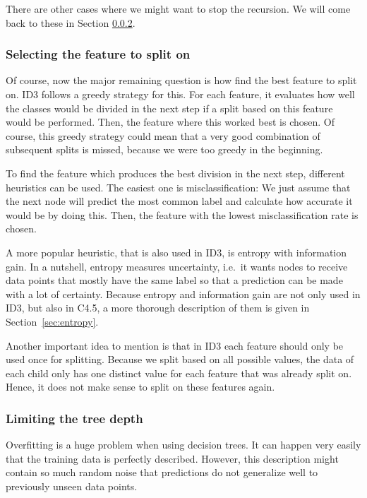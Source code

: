 \documentclass[a4paper]{article}
\begin{document}
There are other cases where we might want to stop the recursion. We will come back to these in Section \ref{subsec:id3-depth}.

\subsubsection{Selecting the feature to split on}

Of course, now the major remaining question is how find the best feature to split on. ID3 follows a greedy strategy for this. For each feature, it evaluates how well the classes would be divided in the next step if a split based on this feature would be performed. Then, the feature where this worked best is chosen. Of course, this greedy strategy could mean that a very good combination of subsequent splits is missed, because we were too greedy in the beginning.

To find the feature which produces the best division in the next step, different heuristics can be used. The easiest one is misclassification: We just assume that the next node will predict the most common label and calculate how accurate it would be by doing this. Then, the feature with the lowest misclassification rate is chosen.

A more popular heuristic, that is also used in ID3, is entropy with information gain. In a nutshell, entropy measures uncertainty, i.e.\ it wants nodes to receive data points that mostly have the same label so that a prediction can be made with a lot of certainty. Because entropy and information gain are not only used in ID3, but also in C4.5, a more thorough description of them is given in Section~\ref{sec:entropy}.

Another important idea to mention is that in ID3 each feature should only be used once for splitting. Because we split based on all possible values, the data of each child only has one distinct value for each feature that was already split on. Hence, it does not make sense to split on these features again.

\subsubsection{Limiting the tree depth}
\label{subsec:id3-depth}

Overfitting is a huge problem when using decision trees. It can happen very easily that the training data is perfectly described. However, this description might contain so much random noise that predictions do not generalize well to previously unseen data points.
\end{document}
